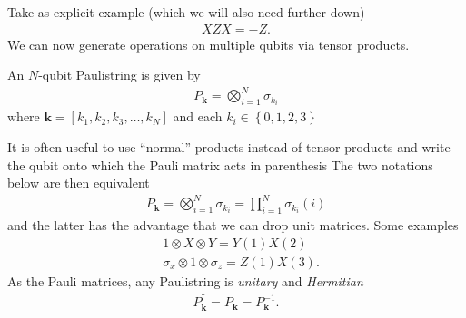 Take as explicit example (which we will also need further down)
\begin{align}
    XZX = -Z\label{eq:XZX=-Z}.
\end{align}
We can now generate operations on multiple qubits via tensor products.
\begin{def*}[Paulistring]
An $N$-qubit Paulistring is given by
    \begin{align}
        P_{\mathbf{k}} = \bigotimes_{i=1} ^{N} \sigma_{k_i}
    \end{align}
    where $\mathbf{k}=\left[k_1,k_2,k_3,\dots, k_N\right]$ and each $k_i\in \left\{0,1,2,3\right\}$
\end{def*}
It is often useful to use ``normal'' products instead of tensor products and write the qubit onto which the Pauli matrix acts in parenthesis
The two notations below are then equivalent
    \begin{align}
        P_{\mathbf{k}} = \bigotimes_{i=1} ^{N} \sigma_{k_i}=\prod_{i=1} ^{N} \sigma_{k_i}(i)
    \end{align}
and the latter has the advantage that we can drop unit matrices. Some examples
\begin{align}
    &1\otimes X \otimes Y = Y(1)X(2) \\
    &\sigma_x \otimes 1 \otimes \sigma_z = Z(1)X(3).
\end{align}
As the Pauli matrices, any Paulistring is \textit{unitary} and \textit{Hermitian}
\begin{align}
    P_\mathbf{k} ^\dagger = P_\mathbf{k} = P_\mathbf{k}^{-1}.
\end{align}

